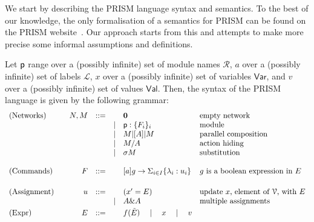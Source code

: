 %
We start by describing the PRISM language syntax and semantics. To the
best of our knowledge, the only formalisation of a semantics for PRISM
can be found on the PRISM website~\cite{prismemantics}. Our approach
starts from this and attempts to make more precise some informal
assumptions and definitions.

\smallskip

 Let $\textsf{p}$ range over a (possibly infinite) set of
module names $\mathcal R$, $a$ over a (possibly infinite) set of
labels $\mathcal L$, $x$ over a (possibly infinite) set of variables
$\mathsf{Var}$, and $v$ over a (possibly infinite) set of values
$\mathsf{Val}$. Then, the syntax of the PRISM language is given by the
following grammar:
\begin{displaymath}
  \begin{array}{lrllll}
    \text{(Networks)}  \quad
    & N, M  & ::=  &      & \mathbf{0} & \text{empty network}\\
    &       &      & \mid & \textsf{p}:\{F_i\}_i & \text{module}\\
    &       &      & \mid & M |[A]| M & \text{parallel composition}\\
    &       &      & \mid & M/A        & \text{action hiding}\\
    &       &      & \mid & \sigma M   & \text{substitution}\\
    \\
    \text{(Commands)}  \quad
    & F     & ::=  &      & [a] g \rightarrow \Sigma_{i\in I}\{\lambda_i: u_i\}
                                  & \text{$g$ is a boolean expression in $E$} \\
    \\[1mm]
    \text{(Assignment)} \quad
    & u     & ::=  &      & (x' = E) & \text{update $x$, element of $\mathcal V$, with $E$}\\
    &       &      & \mid & A \& A   & \text{multiple assignments}
    \\[1mm]
    \text{(Expr)}\quad
    & E     & ::= &       & f(\tilde E)\quad\mid\quad x\quad\mid\quad v
  \end{array}
\end{displaymath}
